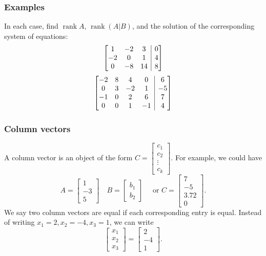 \documentclass[12pt,t]{beamer}
\makeatletter
\newenvironment{amatrix}[1]{%
  \left[\begin{array}{@{}*{#1}{c}|c@{}}
}{%
  \end{array}\right]
}
\DeclareMathOperator{\rank}{rank}
\makeatother
\begin{document}
\begin{frame}\frametitle{Examples}
In each case, find $\rank A$, $\rank (A|B)$, and the solution of the corresponding system of equations:
\begin{equation}
\begin{amatrix}{3}
1 & -2 & 3 & 0\\ -2 & 0 & 1 & 4\\ 0& -8 & 14 & 8
\end{amatrix}
\end{equation}
\begin{equation}
\begin{amatrix}{4}
-2 & 8 & 4 & 0 & 6\\0 & 3 & -2 & 1 & -5\\ -1& 0 & 2 & 6 & 7\\ 0 & 0 & 1 & -1 & 4
\end{amatrix}
\end{equation}
\end{frame}
\begin{frame}\frametitle{Column vectors}
 A \alert{column vector} is an object of the form $C = \begin{bmatrix}c_1\\c_2\\ \vdots \\ c_k\end{bmatrix}$. For example, we could have
\[
 A = \begin{bmatrix}1\\-3\\5\end{bmatrix}\quad B = \begin{bmatrix}b_1\\b_2\end{bmatrix} \quad \text{ or } C=\begin{bmatrix} 7\\ -5\\ 3.72\\0\end{bmatrix}.
\]
We say two column vectors are \alert{equal} if each corresponding entry is equal. Instead of writing $x_1 = 2, x_2 = -4, x_3 = 1$, we can write
\[
 \begin{bmatrix}x_1\\x_2\\x_3\end{bmatrix} = \begin{bmatrix}2\\-4\\1\end{bmatrix}.
\]

\end{frame}
\end{document}
